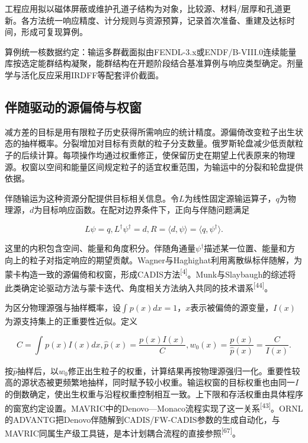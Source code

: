 \documentclass[UTF8, zihao=-4, fontset=none, a4paper]{ctexart}
\newcommand{\upcite}[1]{\textsuperscript{[#1]}}
\begin{document}
工程应用拟以磁体屏蔽或维护孔道子结构为对象，比较源、材料/层厚和孔道更新。各方法统一响应精度、计分规则与资源预算，记录首次准备、重建及达标时间，形成可复现算例。

算例统一核数据约定：输运多群截面拟由FENDL-3.x或ENDF/B-VIII.0连续能量库按选定能群结构凝聚，能群结构在开题阶段结合基准算例与响应类型确定。剂量学与活化反应采用IRDFF等配套评价截面。



\subsection{伴随驱动的源偏倚与权窗}

减方差的目标是用有限粒子历史获得所需响应的统计精度。源偏倚改变粒子出生状态的抽样概率。分裂增加对目标有贡献的粒子分支数量。俄罗斯轮盘减少低贡献粒子的后续计算。每项操作均通过权重修正，使保留历史在期望上代表原来的物理源。权窗以空间和能量区间规定粒子的适宜权重范围，为输运中的分裂和轮盘提供依据。

伴随输运为这种资源分配提供目标相关信息。令\(L\)为线性固定源输运算子，\(q\)为物理源，\(d\)为目标响应函数。在配对边界条件下，正向与伴随问题满足

\begin{equation}
L\psi = q,L^{\dagger}\psi^{\dagger} = d,R = \langle d,\psi\rangle = \langle q,\psi^{\dagger}\rangle.
\label{eq:5}
\end{equation}

这里的内积包含空间、能量和角度积分。伴随角通量\(\psi^{\dagger}\)描述某一位置、能量和方向上的粒子对指定响应的期望贡献。Wagner与Haghighat利用离散纵标伴随解，为蒙卡构造一致的源偏倚和权窗，形成CADIS方法\upcite{4}。Munk与Slaybaugh的综述将此类确定论驱动方法与蒙卡迭代、角度相关方法纳入共同的技术谱系\upcite{44}。

为区分物理源强与抽样概率，设\(\int_{}^{}{p(x)dx} = 1\)，\(x\)表示被偏倚的源变量，\(I(x)\)为源支持集上的正重要性近似。定义

\begin{equation}
C = \int_{}^{}{p(x)I(x)dx},\widehat{p}(x) = \frac{p(x)I(x)}{C},w_{0}(x) = \frac{p(x)}{\widehat{p}(x)} = \frac{C}{I(x)}.
\label{eq:6}
\end{equation}

按\(\widehat{p}\)抽样后，以\(w_{0}\)修正出生粒子的权重，计算结果再按物理源强归一化。重要性较高的源状态被更频繁地抽样，同时赋予较小权重。输运权窗的目标权重也由同一\(I\)的倒数确定，使出生权重与沿程权重控制相互一致。上下限和存活权重由具体程序的窗宽约定设置。MAVRIC中的Denovo---Monaco流程实现了这一关系\upcite{43}。ORNL的ADVANTG把Denovo伴随解到CADIS/FW-CADIS参数的生成自动化，与MAVRIC同属生产级工具链，是本计划耦合流程的直接参照\upcite{67}。
\end{document}
